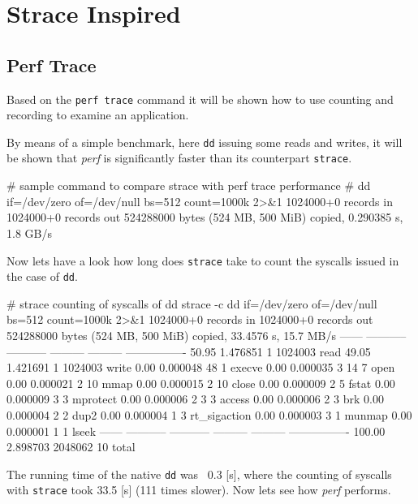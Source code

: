 \chapter{Strace Inspired}
\section{Perf Trace}

Based on the {\tt perf trace} command it will be shown how to use counting
and recording to examine an application.

By means of a simple benchmark, here {\tt dd} issuing some reads and
writes, it will be shown that {\em perf} is significantly faster than its
counterpart {\tt strace}.

\starttyping
# sample command to compare strace with perf trace performance
# dd if=/dev/zero of=/dev/null bs=512 count=1000k 2>&1
1024000+0 records in
1024000+0 records out
524288000 bytes (524 MB, 500 MiB) copied, 0.290385 s, 1.8 GB/s
\stoptyping

Now lets have a look how long does {\tt strace} take to count
the syscalls issued in the case of {\tt dd}.

\starttyping
# strace counting of syscalls of dd
strace -c dd if=/dev/zero of=/dev/null bs=512 count=1000k 2>&1
1024000+0 records in
1024000+0 records out
524288000 bytes (524 MB, 500 MiB) copied, 33.4576 s, 15.7 MB/s
------ ----------- ----------- --------- --------- ----------------
 50.95    1.476851           1   1024003           read
 49.05    1.421691           1   1024003           write
  0.00    0.000048          48         1           execve
  0.00    0.000035           3        14         7 open
  0.00    0.000021           2        10           mmap
  0.00    0.000015           2        10           close
  0.00    0.000009           2         5           fstat
  0.00    0.000009           3         3           mprotect
  0.00    0.000006           2         3         3 access
  0.00    0.000006           2         3           brk
  0.00    0.000004           2         2           dup2
  0.00    0.000004           1         3           rt_sigaction
  0.00    0.000003           3         1           munmap
  0.00    0.000001           1         1           lseek
------ ----------- ----------- --------- --------- ----------------
100.00    2.898703               2048062        10 total
\stoptyping

The running time of the native {\tt dd} was ~0.3 [s], where the counting
of syscalls with {\tt strace} took 33.5 [s] (111 times slower). Now lets
see how {\em perf} performs.

